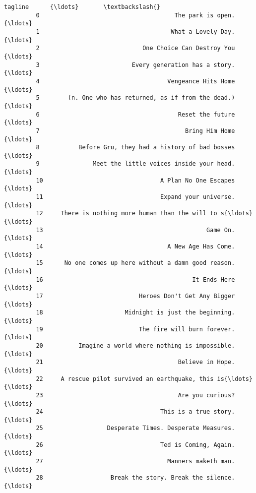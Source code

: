 \documentclass[11pt]{article}
\begin{document}
\begin{Verbatim}[commandchars=\\\{\}]
                                                          tagline      {\ldots}       \textbackslash{}
         0                                      The park is open.      {\ldots}        
         1                                     What a Lovely Day.      {\ldots}        
         2                             One Choice Can Destroy You      {\ldots}        
         3                          Every generation has a story.      {\ldots}        
         4                                    Vengeance Hits Home      {\ldots}        
         5        (n. One who has returned, as if from the dead.)      {\ldots}        
         6                                       Reset the future      {\ldots}        
         7                                         Bring Him Home      {\ldots}        
         8           Before Gru, they had a history of bad bosses      {\ldots}        
         9               Meet the little voices inside your head.      {\ldots}        
         10                                 A Plan No One Escapes      {\ldots}        
         11                                 Expand your universe.      {\ldots}        
         12     There is nothing more human than the will to s{\ldots}      {\ldots}        
         13                                              Game On.      {\ldots}        
         14                                   A New Age Has Come.      {\ldots}        
         15      No one comes up here without a damn good reason.      {\ldots}        
         16                                          It Ends Here      {\ldots}        
         17                           Heroes Don't Get Any Bigger      {\ldots}        
         18                       Midnight is just the beginning.      {\ldots}        
         19                           The fire will burn forever.      {\ldots}        
         20          Imagine a world where nothing is impossible.      {\ldots}        
         21                                      Believe in Hope.      {\ldots}        
         22     A rescue pilot survived an earthquake, this is{\ldots}      {\ldots}        
         23                                      Are you curious?      {\ldots}        
         24                                 This is a true story.      {\ldots}        
         25                  Desperate Times. Desperate Measures.      {\ldots}        
         26                                 Ted is Coming, Again.      {\ldots}        
         27                                   Manners maketh man.      {\ldots}        
         28                   Break the story. Break the silence.      {\ldots}        

\end{Verbatim}
\end{document}

